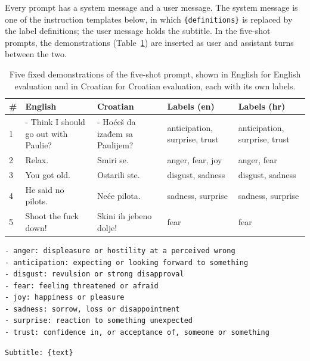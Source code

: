 Every prompt has a system message and a user message. The system message is one of the instruction templates below, in which \texttt{\{definitions\}} is replaced by the label definitions; the user message holds the subtitle. In the five-shot prompts, the demonstrations (Table~\ref{tab:demonstrations}) are inserted as user and assistant turns between the two.

\begin{table}[H]
    \centering
    \caption{Five fixed demonstrations of the five-shot prompt, shown in English for English evaluation and in Croatian for Croatian evaluation, each with its own labels.}
    \label{tab:demonstrations}
    \begin{tabularx}{\textwidth}{l>{\raggedright\arraybackslash}X>{\raggedright\arraybackslash}X>{\raggedright\arraybackslash}X>{\raggedright\arraybackslash}X}
        \toprule
        \# & English & Croatian & Labels (en) & Labels (hr) \\
        \midrule
        1 & - Think I should go out with Paulie? & - Hoćeš da izađem sa Paulijem? & anticipation, surprise, trust & anticipation, surprise, trust \\
        2 & Relax. & Smiri se. & anger, fear, joy & anger, fear \\
        3 & You got old. & Ostarili ste. & disgust, sadness & disgust, sadness \\
        4 & He said no pilots. & Neće pilota. & sadness, surprise & sadness, surprise \\
        5 & Shoot the fuck down! & Skini ih jebeno dolje! & fear & fear \\
        \bottomrule
    \end{tabularx}
\end{table}

\begin{tcolorbox}[title={Label definitions, replacing \texttt{\{definitions\}}}]
\begin{verbatim}
- anger: displeasure or hostility at a perceived wrong
- anticipation: expecting or looking forward to something
- disgust: revulsion or strong disapproval
- fear: feeling threatened or afraid
- joy: happiness or pleasure
- sadness: sorrow, loss or disappointment
- surprise: reaction to something unexpected
- trust: confidence in, or acceptance of, someone or something
\end{verbatim}
\end{tcolorbox}

\begin{tcolorbox}[title={User message}]
\begin{verbatim}
Subtitle: {text}
\end{verbatim}
\end{tcolorbox}

